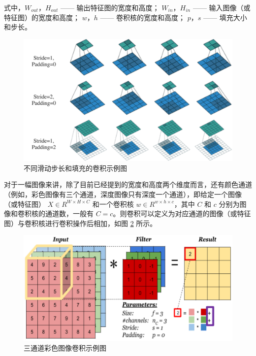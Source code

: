 \noindent 式中，$W_{out}$，$H_{out}$ —— 输出特征图的宽度和高度；\newline
\indent\quad $W_{in}$，$H_{in}$ —— 输入图像（或特征图）的宽度和高度；\newline
\indent\quad $w$，$h$ —— 卷积核的宽度和高度；\newline
\indent\quad $p$，$s$ —— 填充大小和步长。

\begin{figure}[!htbp]
	\centering
	\includegraphics{figures/3.png}
	\caption{不同滑动步长和填充的卷积示例图}
	\label{fig:fig2-2}
	\vspace{-0.8cm}  %
\end{figure}

对于一幅图像来讲，除了目前已经提到的宽度和高度两个维度而言，还有颜色通道（例如，彩色图像有三个通道，深度图像只有深度一个通道），即给定一个图像（或特征图） $X\in R^{W\times H\times C}$ 和一个卷积核 $w\in R^{w\times h\times c}$，其中 $C$ 和 $c$ 分别为图像和卷积核的通道数，一般有 $C=c$。则卷积可以定义为对应通道的图像（或特征图）与卷积核进行卷积操作后相加，如图 \ref{fig:fig2-3} 所示。

\begin{figure}[!htbp]
	\centering
	\includegraphics{figures/4.png}
	\caption{三通道彩色图像卷积示例图}
	\label{fig:fig2-3}
	\vspace{-0.8cm}  %
\end{figure}


